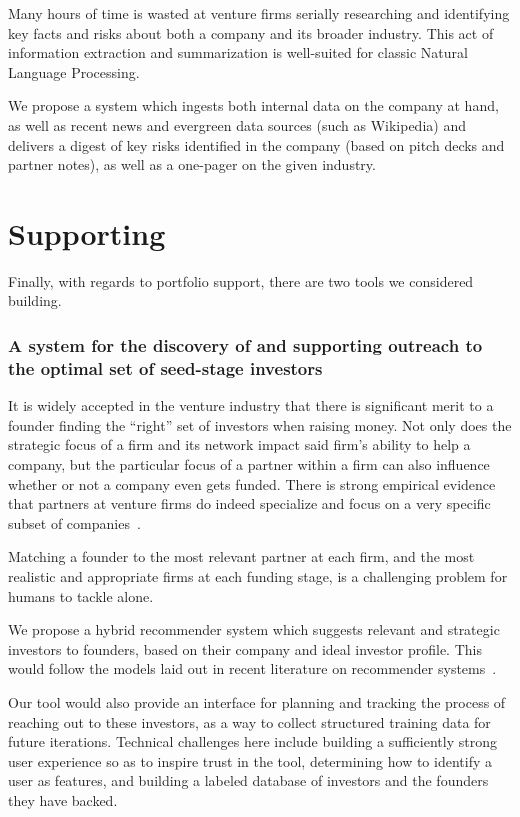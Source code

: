 Many hours of time is wasted at venture firms serially researching and identifying key facts and risks about both a company and its broader industry. This act of information extraction and summarization is well-suited for classic Natural Language Processing.

We propose a system which ingests both internal data on the company at hand, as well as recent news and evergreen data sources (such as Wikipedia) and delivers a digest of key risks identified in the company (based on pitch decks and partner notes), as well as a one-pager on the given industry.

\section{Supporting}

Finally, with regards to portfolio support, there are two tools we considered building.

\subsubsection{A system for the discovery of and supporting outreach to the optimal set of seed-stage investors}

It is widely accepted in the venture industry that there is significant merit to a founder finding the ``right'' set of investors when raising money. Not only does the strategic focus of a firm and its network impact said firm's ability to help a company, but the particular focus of a partner within a firm can also influence whether or not a company even gets funded. There is strong empirical evidence that partners at venture firms do indeed specialize and focus on a very specific subset of companies~\cite{Stone:2013:EST:2541167.2507882}.

Matching a founder to the most relevant partner at each firm, and the most realistic and appropriate firms at each funding stage, is a challenging problem for humans to tackle alone.

We propose a hybrid recommender system which suggests relevant and strategic investors to founders, based on their company and ideal investor profile. This would follow the models laid out in recent literature on recommender systems~\cite{Burke2002}.

Our tool would also provide an interface for planning and tracking the process of reaching out to these investors, as a way to collect structured training data for future iterations. Technical challenges here include building a sufficiently strong user experience so as to inspire trust in the tool, determining how to identify a user as features, and building a labeled database of investors and the founders they have backed.

